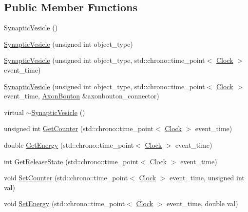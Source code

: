 \subsection*{Public Member Functions}
\begin{DoxyCompactItemize}
\item 
\mbox{\hyperlink{classSynapticVesicle_ac3f899ed25281a6d337ecefe1da41c67}{Synaptic\+Vesicle}} ()
\item 
\mbox{\hyperlink{classSynapticVesicle_aefd8a743e80077235a1c9a9fd133cc9d}{Synaptic\+Vesicle}} (unsigned int object\+\_\+type)
\item 
\mbox{\hyperlink{classSynapticVesicle_a6602b03ba498129b46c173e8fa66927b}{Synaptic\+Vesicle}} (unsigned int object\+\_\+type, std\+::chrono\+::time\+\_\+point$<$ \mbox{\hyperlink{universe_8h_a0ef8d951d1ca5ab3cfaf7ab4c7a6fd80}{Clock}} $>$ event\+\_\+time)
\item 
\mbox{\hyperlink{classSynapticVesicle_a0f86278b771137978d03bb6cf460a527}{Synaptic\+Vesicle}} (unsigned int object\+\_\+type, std\+::chrono\+::time\+\_\+point$<$ \mbox{\hyperlink{universe_8h_a0ef8d951d1ca5ab3cfaf7ab4c7a6fd80}{Clock}} $>$ event\+\_\+time, \mbox{\hyperlink{classAxonBouton}{Axon\+Bouton}} \&axonbouton\+\_\+connector)
\item 
virtual \mbox{\hyperlink{classSynapticVesicle_a9bbc23a1c9757d8522a10bb28e0f575b}{$\sim$\+Synaptic\+Vesicle}} ()
\item 
unsigned int \mbox{\hyperlink{classSynapticVesicle_a42a3ab6704c27ca55531864c46f0fc2b}{Get\+Counter}} (std\+::chrono\+::time\+\_\+point$<$ \mbox{\hyperlink{universe_8h_a0ef8d951d1ca5ab3cfaf7ab4c7a6fd80}{Clock}} $>$ event\+\_\+time)
\item 
double \mbox{\hyperlink{classSynapticVesicle_a0c4d7e936023cf0f719d0a4d3f315c9c}{Get\+Energy}} (std\+::chrono\+::time\+\_\+point$<$ \mbox{\hyperlink{universe_8h_a0ef8d951d1ca5ab3cfaf7ab4c7a6fd80}{Clock}} $>$ event\+\_\+time)
\item 
int \mbox{\hyperlink{classSynapticVesicle_a6cc0018a0fd02cf99f1ba0ad31f495bc}{Get\+Release\+State}} (std\+::chrono\+::time\+\_\+point$<$ \mbox{\hyperlink{universe_8h_a0ef8d951d1ca5ab3cfaf7ab4c7a6fd80}{Clock}} $>$ event\+\_\+time)
\item 
void \mbox{\hyperlink{classSynapticVesicle_a7fd7cfce5eccb904206d968866f85220}{Set\+Counter}} (std\+::chrono\+::time\+\_\+point$<$ \mbox{\hyperlink{universe_8h_a0ef8d951d1ca5ab3cfaf7ab4c7a6fd80}{Clock}} $>$ event\+\_\+time, unsigned int val)
\item 
void \mbox{\hyperlink{classSynapticVesicle_ac98f9c8ccaabbccc38151c51d204dfec}{Set\+Energy}} (std\+::chrono\+::time\+\_\+point$<$ \mbox{\hyperlink{universe_8h_a0ef8d951d1ca5ab3cfaf7ab4c7a6fd80}{Clock}} $>$ event\+\_\+time, double val)

\end{DoxyCompactItemize}
